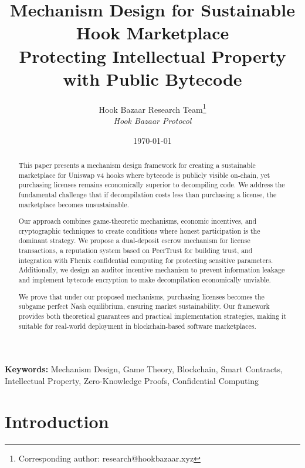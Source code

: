 \documentclass[11pt,a4paper]{article}
\title{%
    \textbf{Mechanism Design for Sustainable Hook Marketplace} \\
    \large{Protecting Intellectual Property with Public Bytecode}
}
\author{%
    Hook Bazaar Research Team\thanks{Corresponding author: research@hookbazaar.xyz} \\
    \textit{Hook Bazaar Protocol}
}
\date{\today}
\theoremstyle{definition}
\theoremstyle{remark}
\begin{document}
\maketitle


\begin{abstract}
This paper presents a mechanism design framework for creating a sustainable marketplace for Uniswap v4 hooks where bytecode is publicly visible on-chain, yet purchasing licenses remains economically superior to decompiling code. We address the fundamental challenge that if decompilation costs less than purchasing a license, the marketplace becomes unsustainable. 

Our approach combines game-theoretic mechanisms, economic incentives, and cryptographic techniques to create conditions where honest participation is the dominant strategy. We propose a dual-deposit escrow mechanism for license transactions, a reputation system based on PeerTrust for building trust, and integration with Fhenix confidential computing for protecting sensitive parameters. Additionally, we design an auditor incentive mechanism to prevent information leakage and implement bytecode encryption to make decompilation economically unviable.

We prove that under our proposed mechanisms, purchasing licenses becomes the subgame perfect Nash equilibrium, ensuring market sustainability. Our framework provides both theoretical guarantees and practical implementation strategies, making it suitable for real-world deployment in blockchain-based software marketplaces.
\end{abstract}

\textbf{Keywords:} Mechanism Design, Game Theory, Blockchain, Smart Contracts, Intellectual Property, Zero-Knowledge Proofs, Confidential Computing


\newpage
\tableofcontents
\newpage


\section{Introduction}
\end{document}
